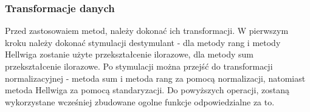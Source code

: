 \documentclass[12pt,a4paper]{report}
\begin{document}
{\begin{Shaded}
\begin{Highlighting}[]
\NormalTok{dane_porzadkowanie<-zbior_danych[}\NormalTok{(}\NormalTok{,}\NormalTok{,}\NormalTok{,}
                                   \NormalTok{,}
                                   \NormalTok{,}\NormalTok{)]}
\end{Highlighting}
\end{Shaded}

\subsubsection{Transformacje danych}\label{transformacje-danych}

Przed zastosowaiem metod, należy dokonać ich transformacji. W pierwszym
kroku należy dokonać stymulacji destymulant - dla metody rang i metody
Hellwiga zostanie użyte przekształcenie ilorazowe, dla metody sum
przekształcenie ilorazowe. Po stymulacji można przejść do transformacji
normalizacyjnej - metoda sum i metoda rang za pomocą normalizacji,
natomiast metoda Hellwiga za pomocą standaryzacji. Do powyższych
operacji, zostaną wykorzystane wcześniej zbudowane ogolne funkcje
odpowiedzialne za to.

\begin{Shaded}
\begin{Highlighting}[]
  \NormalTok{\{}
  \NormalTok{(x[}\NormalTok{(}\NormalTok{(x)==y)])}
  \NormalTok{:}
  \NormalTok{\{}
    \NormalTok{x[i,}\NormalTok{(}\NormalTok{(x)==y)]=max_wartosc-x[i,}\NormalTok{(}\NormalTok{(x)==y)]}
  \NormalTok{\}}
  \NormalTok{\}}

  \NormalTok{\{}
  \NormalTok{:}
  \NormalTok{\{}
    \NormalTok{x[i,}\NormalTok{(}\NormalTok{(x)==y)]=}\NormalTok{/x[i,}\NormalTok{(}\NormalTok{(x)==y)]}
  \NormalTok{\}}
  \NormalTok{\}}


\end{Highlighting}
\end{Shaded}}
\end{document}
